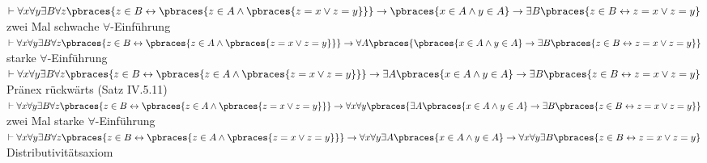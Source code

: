 \begin{solution}
\begin{algorithmic}[1]
	\State $\vdash \forall x \forall y \exists B \forall z \pbraces{z \in B \leftrightarrow \pbraces{ z \in A \land \pbraces{z = x \lor z = y}}} \rightarrow \pbraces{x \in A \land y \in A} \rightarrow \exists B \pbraces{z \in B \leftrightarrow z = x \lor z=y}$ \Comment zwei Mal schwache $\forall$-Einführung
	\State $\vdash \forall x \forall y \exists B \forall z \pbraces{z \in B \leftrightarrow \pbraces{ z \in A \land \pbraces{z = x \lor z = y}}} \rightarrow \forall A\pbraces{\pbraces{x \in A \land y \in A} \rightarrow \exists B \pbraces{z \in B \leftrightarrow z = x \lor z=y}}$ \Comment starke $\forall$-Einführung
	\State $\vdash \forall x \forall y \exists B \forall z \pbraces{z \in B \leftrightarrow \pbraces{ z \in A \land \pbraces{z = x \lor z = y}}} \rightarrow \exists A \pbraces{x \in A \land y \in A} \rightarrow \exists B \pbraces{z \in B \leftrightarrow z = x \lor z=y}$ \Comment Pränex rückwärts (Satz IV.5.11)
	\State $\vdash \forall x \forall y \exists B \forall z \pbraces{z \in B \leftrightarrow \pbraces{ z \in A \land \pbraces{z = x \lor z = y}}} \rightarrow \forall x \forall y\pbraces{\exists A \pbraces{x \in A \land y \in A} \rightarrow \exists B \pbraces{z \in B \leftrightarrow z = x \lor z=y}}$ \Comment zwei Mal starke $\forall$-Einführung
	\State $\vdash \forall x \forall y \exists B \forall z \pbraces{z \in B \leftrightarrow \pbraces{ z \in A \land \pbraces{z = x \lor z = y}}} \rightarrow \forall x \forall y \exists A \pbraces{x \in A \land y \in A} \rightarrow \forall x \forall y \exists B \pbraces{z \in B \leftrightarrow z = x \lor z=y}$ \Comment Distributivitätsaxiom
\end{algorithmic}

\end{solution}
